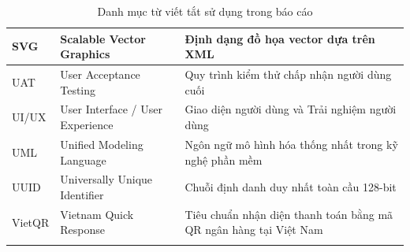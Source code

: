 \begin{longtable}{|p{2.8cm}|p{5.5cm}|p{6.7cm}|}
SVG & Scalable Vector Graphics & Định dạng đồ họa vector dựa trên XML \\ \hline
UAT & User Acceptance Testing & Quy trình kiểm thử chấp nhận người dùng cuối \\ \hline
UI/UX & User Interface / User Experience & Giao diện người dùng và Trải nghiệm người dùng \\ \hline
UML & Unified Modeling Language & Ngôn ngữ mô hình hóa thống nhất trong kỹ nghệ phần mềm \\ \hline
UUID & Universally Unique Identifier & Chuỗi định danh duy nhất toàn cầu 128-bit \\ \hline
VietQR & Vietnam Quick Response & Tiêu chuẩn nhận diện thanh toán bằng mã QR ngân hàng tại Việt Nam \\ \hline
\caption{Danh mục từ viết tắt sử dụng trong báo cáo}
\label{tab:viettat}
\end{longtable}
